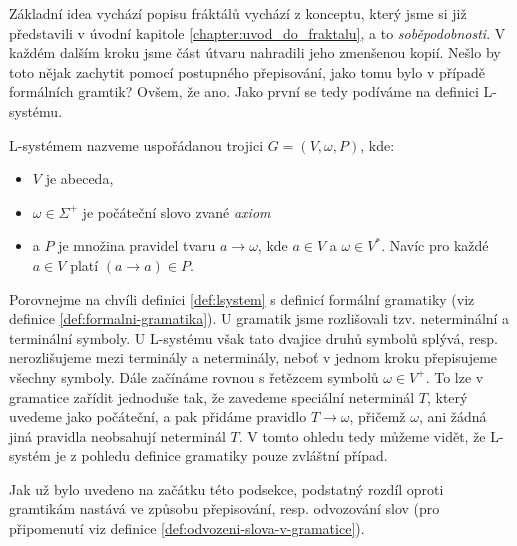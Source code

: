 Základní idea vychází popisu fráktálů vychází z konceptu, který jsme si již představili v úvodní kapitole \ref{chapter:uvod_do_fraktalu}, a to \emph{soběpodobnosti}. V každém dalším kroku jsme část útvaru nahradili jeho zmenšenou kopií. Nešlo by toto nějak zachytit pomocí postupného přepisování, jako tomu bylo v případě formálních gramtik? Ovšem, že ano. Jako první se tedy podíváme na definici L-systému.
\begin{definition}[L-systém]\label{def:lsystem}
    L-systémem nazveme uspořádanou trojici $G=(V,\omega,P)$, kde:
    \begin{itemize}
        \item $V$ je abeceda,
        \item $\omega\in\Sigma^+$ je počáteční slovo zvané \emph{axiom}
        \item a $P$ je množina pravidel tvaru $a\to\omega$, kde $a\in V$ a $\omega\in V^*$. Navíc pro každé $a\in V$ platí $(a\to a)\in P$.
    \end{itemize}
\end{definition}
Porovnejme na chvíli definici \ref{def:lsystem} s definicí formální gramatiky (viz definice \ref{def:formalni-gramatika}). U gramatik jsme rozlišovali tzv. neterminální a terminální symboly. U L-systému však tato dvajice druhů symbolů splývá, resp. nerozlišujeme mezi terminály a neterminály, neboť v jednom kroku přepisujeme všechny symboly. Dále začínáme rovnou s řetězcem symbolů $\omega\in V^+$. To lze v gramatice zařídit jednoduše tak, že zavedeme speciální neterminál $T$, který uvedeme jako počáteční, a pak přidáme pravidlo $T\to\omega$, přičemž $\omega$, ani žádná jiná pravidla neobsahují neterminál $T$. V tomto ohledu tedy můžeme vidět, že L-systém je z pohledu definice gramatiky pouze zvláštní případ.

Jak už bylo uvedeno na začátku této podsekce, podstatný rozdíl oproti gramtikám nastává ve způsobu přepisování, resp. odvozování slov (pro připomenutí viz definice \ref{def:odvozeni-slova-v-gramatice}).
\begin{definition}\label{def:odvozeni-slova-v-lsystemu}
    
\end{definition}